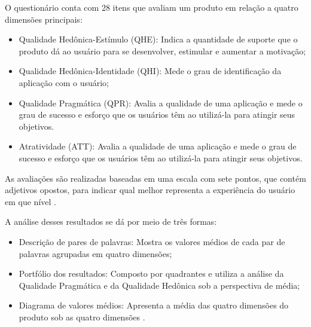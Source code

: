 \begin{description}
\item O questionário conta com 28 itens que avaliam um produto em relação a quatro dimensões principais:
      \begin{itemize}
          \item Qualidade Hedônica-Estímulo (QHE): Indica a quantidade de suporte que o produto dá ao usuário para se 
          desenvolver, estimular e aumentar a motivação;

          \item Qualidade Hedônica-Identidade (QHI): Mede o grau de identificação da aplicação com o usuário;

          \item Qualidade Pragmática (QPR): Avalia a qualidade de uma aplicação e mede o grau de sucesso e esforço que 
          os usuários têm ao utilizá-la para atingir seus objetivos.

          \item Atratividade (ATT): Avalia a qualidade de uma aplicação e mede o grau de sucesso e esforço que os 
          usuários têm ao utilizá-la para atingir seus objetivos.
      \end{itemize}
\end{description}

As avaliações são realizadas baseadas em uma escala com sete pontos, que contém adjetivos opostos, para indicar qual  
melhor representa a experiência do usuário em que nível \cite{natashatayana2015} \cite{hassenzahl2003}.

\begin{description}
    \item A análise desses resultados se dá por meio de três formas: 
          \begin{itemize}
              \item Descrição de pares de palavras: Mostra os valores médios de cada par de palavras agrupadas em quatro dimensões;
    
              \item Portfólio dos resultados: Composto por quadrantes e utiliza a análise da Qualidade Pragmática e da Qualidade 
              Hedônica sob a perspectiva de média;
    
              \item Diagrama de valores médios: Apresenta a média das quatro dimensões do produto sob as quatro dimensões \cite{providencia2021}.
          \end{itemize}
\end{description}

